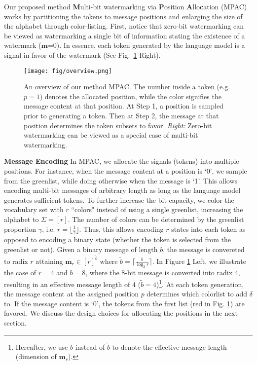 Our proposed method \textbf{M}ulti-bit watermarking via \textbf{P}osition \textbf{A}llo\textbf{c}ation (MPAC) works by partitioning the tokens to message positions and enlarging the size of the alphabet through color-listing. First, notice that zero-bit watermarking can be viewed as watermarking a single bit of information stating the existence of a watermark ($\mathbf{m}$=0). In essence, each token generated by the language model is a signal in favor of the watermark (See Fig.~\ref{fig:multi-bit}-Right).


\begin{figure}[t]
    \vspace{-3mm}
    \centering
    \texttt{[image: fig/overview.png]}
    \caption{An overview of our method MPAC. The number inside a token (e.g. $\boxed{p=1}$) denotes the allocated position, while the color signifies the message content at that position. At Step 1, a position is sampled prior to generating a token. Then at Step 2, the message at that position determines the token subsets to favor. \textit{Right:} Zero-bit watermarking can be viewed as a special case of multi-bit watermarking.} 
    \label{fig:multi-bit}
\vspace{-4mm}
\end{figure}

\noindent\textbf{Message Encoding}
In MPAC, we allocate the signals (tokens) into multiple positions. For instance, when the message content at a position is `0', we sample from the greenlist, while doing otherwise when the message is `1'. This allows encoding multi-bit messages of arbitrary length as long as the language model generates sufficient tokens. To further increase the bit capacity, we color the vocabulary set with $r$ ``colors" instead of using a single greenlist, increasing the alphabet to $\Sigma=[r]$. %
The number of colors can be determined by the greenlist proportion $\gamma$, i.e. $r = \lfloor \frac{1}{\gamma} \rfloor$. Thus, this allows encoding $r$ states into each token as opposed to encoding a binary state (whether the token is selected from the greenlist or not). Given a binary message of length $b$, the message is convereted to radix $r$ attaining $\mathbf{m}_r \in [r]^{\tilde b}$ where $\tilde b=\lceil \frac{b}{\log_2{r}} \rceil $. 
In Figure \ref{fig:multi-bit} Left, we illustrate the case of $r=4$ and $b=8$, where the 8-bit message is converted into radix $4$, resulting in an effective message length of 4 ($\tilde b=4$)\footnote{Hereafter, we use $b$ instead of $\tilde b$ to denote the effective message length (dimension of $\mathbf{m}_r$).}. At each token generation, the message content at the assigned position $p$ determines which colorlist to add $\delta$ to. If the message content is `0', the tokens from the first list (red in Fig. \ref{fig:multi-bit}) are favored. We discuss the design choices for allocating the positions in the next section.

